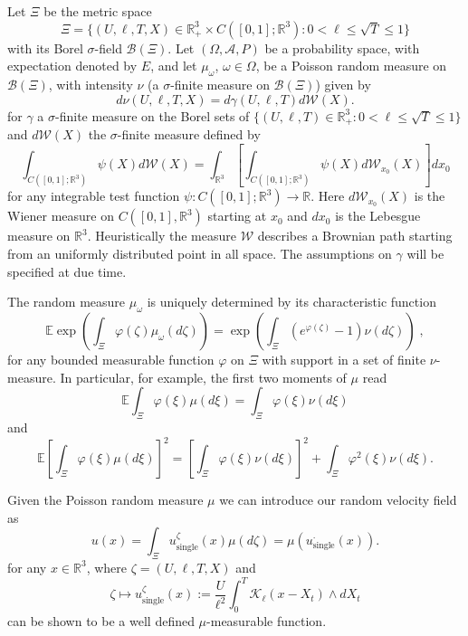 \documentclass[11pt]{preprint}
\begin{document}
Let $\Xi$ be the metric space
\[
\Xi=\{(U,\ell,T,X)\in\mathbb{R}_{+}^{3}\times C([0,1];\mathbb{R}^{3}%
):0<\ell\leq\sqrt{T}\leq1\}
\]
with its Borel $\sigma$-field $\mathcal{B}\left(  \Xi\right)  $. Let $\left(
\Omega,\mathcal{A},P\right)  $ be a probability space, with expectation
denoted by $E$, and let $\mu_{\omega}$, $\omega\in\Omega$, be a Poisson random
measure on $\mathcal{B}\left(  \Xi\right)  $, with intensity $\nu$ (a $\sigma
$-finite measure on $\mathcal{B}\left(  \Xi\right)  $) given by
\[
d\nu(U,\ell,T,X)=d\gamma(U,\ell,T)d\mathcal{W}(X).
\]
for $\gamma$ a $\sigma$-finite measure on the Borel sets of $\{(U,\ell
,T)\in\mathbb{R}_{+}^{3}:0<\ell\leq\sqrt{T}\leq1\}$ and $d\mathcal{W}(X)$ the
$\sigma$-finite measure defined by
\[
\int_{C([0,1];\mathbb{R}^{3})} \psi(X) d\mathcal{W}(X) = \int_{\mathbb{R}^{3}}
\left[  \int_{C([0,1];\mathbb{R}^{3})} \psi(X) d\mathcal{W}_{x_{0}}(X)\right]
dx_{0}%
\]
for any integrable test function $\psi: C([0,1];\mathbb{R}^{3}) \to\mathbb{R}
$. Here $d\mathcal{W}_{x_{0}}(X)$ is the Wiener measure on $C([0,1],\mathbb{R}%
^{3})$ starting at $x_{0}$ and $dx_{0}$ is the Lebesgue measure on
$\mathbb{R}^{3}$. Heuristically the measure $\mathcal{W}$ describes a Brownian
path starting from an uniformly distributed point in all space. The
assumptions on $\gamma$ will be specified at due time.

The random measure $\mu_{\omega}$ is uniquely determined by its characteristic
function
\[
\mathbb{E}\exp\left(  \int_{\Xi}\varphi(\zeta)\mu_\omega(d\zeta)\right)
=\exp\left(  \int_{\Xi}(e^{\varphi(\zeta)}-1)\nu(d\zeta)\right)\;,
\]
for any bounded measurable function $\varphi$ on $\Xi$ with support in a set
of finite $\nu$-measure. In particular, for example, the first two moments of
$\mu$ read
\[
\mathbb{E}\int_{\Xi}\varphi(\xi)\mu(d\xi)=\int_{\Xi}\varphi(\xi)\nu(d\xi)
\]
and
\[
\mathbb{E}\left[  \int_{\Xi}\varphi(\xi)\mu(d\xi)\right]  ^{2}=\left[
\int_{\Xi}\varphi(\xi)\nu(d\xi)\right]  ^{2}+\int_{\Xi}\varphi^{2}(\xi
)\nu(d\xi).
\]

Given the Poisson random measure $\mu$ we can introduce our random velocity
field as
\begin{equation}
u(x)=\int_{\Xi}u_{\text{single}}^{\zeta}\left(  x\right)  \mu(d\zeta
)=\mu\left(  u_{\text{single}}^{\cdot}\left(  x\right)  \right)  .
\end{equation}
for any $x \in\mathbb{R}^{3}$, where $\zeta= (U,\ell,T,X)$ and
\[
\zeta\mapsto u_{\text{single}}^{\zeta}\left(  x\right)  :=\frac{U}{\ell^{2}%
}\int_{0}^{T}\mathcal{K}_{\ell}(x-X_{t})\wedge dX_{t}%
\]
can be shown to be a well defined $\mu$-measurable function.
\end{document}
